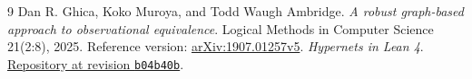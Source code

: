 \documentclass[11pt,a4paper]{article}
\theoremstyle{definition}
\theoremstyle{plain}
\theoremstyle{remark}
\begin{document}







\begin{thebibliography}{9}
Dan R. Ghica, Koko Muroya, and Todd Waugh Ambridge.
\emph{A robust graph-based approach to observational equivalence}.
Logical Methods in Computer Science 21(2:8), 2025.
Reference version: \href{https://arxiv.org/abs/1907.01257v5}{arXiv:1907.01257v5}.
\emph{Hypernets in Lean 4}.
\href{https://github.com/danghica/hypernets-lean/tree/b04b40bdf36741d221566c49620095c32581486c}{Repository at revision \texttt{b04b40b}}.
\end{thebibliography}
\clearpage
\appendix

\clearpage

\end{document}

